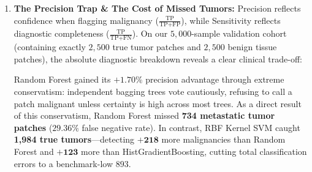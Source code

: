 \documentclass[11pt,a4paper]{article}
\begin{document}
\begin{enumerate}[leftmargin=*]
    \item \textbf{The Precision Trap \& The Cost of Missed Tumors:}
    Precision reflects confidence when flagging malignancy ($\frac{\text{TP}}{\text{TP} + \text{FP}}$), while Sensitivity reflects diagnostic completeness ($\frac{\text{TP}}{\text{TP} + \text{FN}}$). On our $5,000$-sample validation cohort (containing exactly $2,500$ true tumor patches and $2,500$ benign tissue patches), the absolute diagnostic breakdown reveals a clear clinical trade-off:
    
    \begin{table}[H]
    \centering
    \small
    \caption{Diagnostic Error Breakdown across Candidate Models on 5,000 Validation Patches.}
    \label{tab:diagnostic_breakdown}
    \end{table}

    Random Forest gained its $+1.70\%$ precision advantage through extreme conservatism: independent bagging trees vote cautiously, refusing to call a patch malignant unless certainty is high across most trees. As a direct result of this conservatism, Random Forest missed \textbf{734 metastatic tumor patches} ($29.36\%$ false negative rate). In contrast, RBF Kernel SVM caught \textbf{1,984 true tumors}---detecting $\mathbf{+218}$ more malignancies than Random Forest and $\mathbf{+123}$ more than HistGradientBoosting, cutting total classification errors to a benchmark-low $893$.


\end{enumerate}
\end{document}
